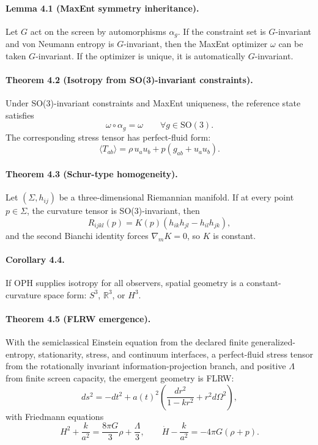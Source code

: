 \paragraph{\textbf{Lemma 4.1 (MaxEnt symmetry inheritance).}}
Let \(G\) act on the screen by automorphisms \(\alpha_g\). If the constraint set is
\(G\)-invariant and von Neumann entropy is \(G\)-invariant, then the MaxEnt optimizer \(\omega\)
can be taken \(G\)-invariant. If the optimizer is unique, it is automatically \(G\)-invariant.

\paragraph{\textbf{Theorem 4.2 (Isotropy from SO(3)-invariant constraints).}}
Under SO(3)-invariant constraints and MaxEnt uniqueness, the reference state satisfies
\[
\omega\circ\alpha_g=\omega
\qquad
\forall g\in \mathrm{SO}(3).
\]
The corresponding stress tensor has perfect-fluid form:
\[
\langle T_{ab}\rangle=\rho\,u_au_b+p(g_{ab}+u_au_b).
\]

\paragraph{\textbf{Theorem 4.3 (Schur-type homogeneity).}}
Let \((\Sigma,h_{ij})\) be a three-dimensional Riemannian manifold. If at every point
\(p\in\Sigma\), the curvature tensor is SO(3)-invariant, then
\[
R_{ijkl}(p)=K(p)(h_{ik}h_{jl}-h_{il}h_{jk}),
\]
and the second Bianchi identity forces \(\nabla_m K=0\), so \(K\) is constant.

\paragraph{\textbf{Corollary 4.4.}}
If OPH supplies isotropy for all observers, spatial geometry is a constant-curvature space form:
\(S^3\), \(\mathbb R^3\), or \(H^3\).

\paragraph{\textbf{Theorem 4.5 (FLRW emergence).}}
With the semiclassical Einstein equation from the declared finite generalized-entropy,
stationarity, stress, and continuum interfaces, a perfect-fluid stress tensor from the
rotationally invariant information-projection branch, and positive \(\Lambda\)
from finite screen capacity, the emergent geometry is FLRW:
\[
ds^2=-dt^2+a(t)^2\left(\frac{dr^2}{1-kr^2}+r^2d\Omega^2\right),
\]
with Friedmann equations
\[
H^2+\frac{k}{a^2}=\frac{8\pi G}{3}\rho+\frac{\Lambda}{3},
\qquad
\dot H-\frac{k}{a^2}=-4\pi G(\rho+p).
\]

